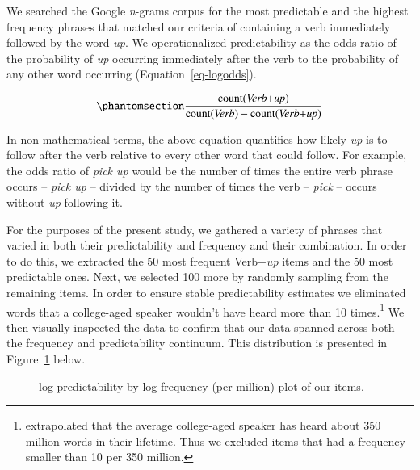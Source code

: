 \documentclass[
  authoryear,
  preprint,
  1p,
  onecolumn]{elsarticle}
\begin{document}
We searched the Google \emph{n}-grams corpus
\citep{linSyntacticAnnotationsGoogle2012} for the most predictable and
the highest frequency phrases that matched our criteria of containing a
verb immediately followed by the word \emph{up}. We operationalized
predictability as the odds ratio of the probability of \emph{up}
occurring immediately after the verb to the probability of any other
word occurring (Equation~\ref{eq-logodds}).

\begin{equation}\phantomsection\label{eq-logodds}{
\frac{\mathrm{count(\textit{Verb+up})}}{\mathrm{count(\textit{Verb})} - \mathrm{count(\textit{Verb+up})}} 
}\end{equation}

In non-mathematical terms, the above equation quantifies how likely
\emph{up} is to follow after the verb relative to every other word that
could follow. For example, the odds ratio of \emph{pick up} would be the
number of times the entire verb phrase occurs -- \emph{pick up} --
divided by the number of times the verb -- \emph{pick} -- occurs without
\emph{up} following it.

For the purposes of the present study, we gathered a variety of phrases
that varied in both their predictability and frequency and their
combination. In order to do this, we extracted the 50 most frequent
Verb+\emph{up} items and the 50 most predictable ones. Next, we selected
100 more by randomly sampling from the remaining items. In order to
ensure stable predictability estimates we eliminated words that a
college-aged speaker wouldn't have heard more than 10 times.\footnote{\citet{levyProcessingExtraposedStructures2012}
  extrapolated that the average college-aged speaker has heard about 350
  million words in their lifetime. Thus we excluded items that had a
  frequency smaller than 10 per 350 million.} We then visually inspected
the data to confirm that our data spanned across both the frequency and
predictability continuum. This distribution is presented in
Figure~\ref{fig-stimplot} below.

\begin{figure}


\caption{\label{fig-stimplot}log-predictability by log-frequency (per
million) plot of our items.}

\end{figure}%
\end{document}
